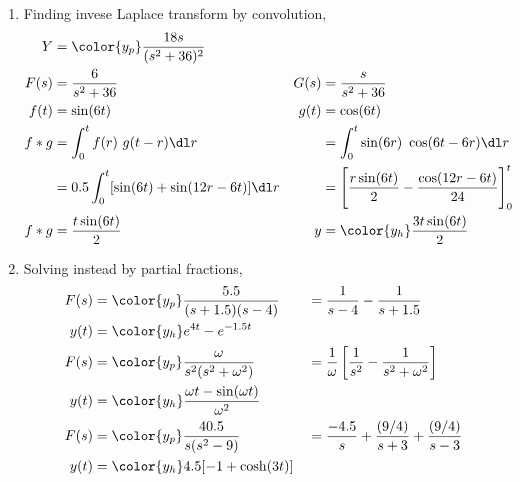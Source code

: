 \begin{enumerate}
    \item Finding invese Laplace transform by convolution,
          \begin{align}
              Y     & = \color{y_p} \frac{18s}{(s^2 + 36)^2}                                \\
              F(s)  & = \frac{6}{s^2 + 36}                                                &
              G(s)  & = \frac{s}{s^2 + 36}                                                  \\
              f(t)  & = \sin(6t)                                                          &
              g(t)  & = \cos(6t)                                                            \\
              f * g & = \int_{0}^{t} f(r)\ g(t-r) \dl r                                   &
                    & = \int_{0}^{t} \sin(6r)\ \cos(6t - 6r) \dl r                          \\
                    & = 0.5\int_{0}^{t} [\sin(6t) + \sin(12r - 6t)] \dl r                 &
                    & = \Bigg[ \frac{r\sin(6t)}{2} - \frac{\cos(12r - 6t)}{24} \Bigg]_0^t   \\
              f * g & = \frac{t \sin(6t)}{2}                                              &
              y     & = \color{y_h} \frac{3t\sin(6t)}{2}
          \end{align}

    \item Solving instead by partial fractions,
          \begin{align}
              F(s) & = \color{y_p} \frac{5.5}{(s + 1.5)(s - 4)}                   &
                   & = \frac{1}{s - 4} - \frac{1}{s + 1.5}                          \\
              y(t) & = \color{y_h} e^{4t} - e^{-1.5t}                               \\
              F(s) & = \color{y_p} \frac{\omega}{s^2(s^2 + \omega^2)}             &
                   & = \frac{1}{\omega} \left[ \frac{1}{s^2}
              - \frac{1}{s^2 + \omega^2} \right]                                    \\
              y(t) & = \color{y_h} \frac{\omega t - \sin(\omega t)}{\omega^2}       \\
              F(s) & = \color{y_p} \frac{40.5}{s(s^2 - 9)}                        &
                   & = \frac{-4.5}{s} + \frac{(9/4)}{s + 3} + \frac{(9/4)}{s - 3}   \\
              y(t) & = \color{y_h} 4.5[-1 + \cosh(3t)]
          \end{align}
\end{enumerate}
